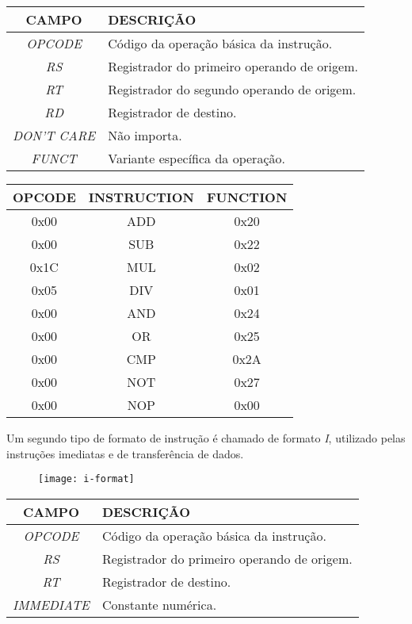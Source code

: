 \begin{table}[H]
\centering	
\begin{tabular}{|c|l|}
	\hline 
	\cellcolor[gray]{0.9}\textbf{CAMPO} & \cellcolor[gray]{0.9}\textbf{DESCRIÇÃO} \\ 
	\hline 
	\textit{OPCODE} & Código da operação básica da instrução. \\ 
	\hline 
	\textit{RS} & Registrador do primeiro operando de origem. \\ 
	\hline 
	\textit{RT} & Registrador do segundo operando de origem. \\ 
	\hline 
	\textit{RD} & Registrador de destino. \\ 
	\hline 
	\textit{DON'T CARE} & Não importa. \\ 
	\hline 
	\textit{FUNCT} & Variante específica da operação. \\ 
	\hline 
	\end{tabular} 
	\end{table}	

\begin{table}[H]
\centering
	\begin{tabular}{|c|c|c|}
  	\hline 
  	\cellcolor[gray]{0.9}\textbf{OPCODE} & \cellcolor[gray]{0.9}\textbf{INSTRUCTION} & \cellcolor[gray]{0.9}\textbf{FUNCTION} \\ 
  	\hline 
  	0x00 & ADD & 0x20 \\ 
  	\hline 
  	0x00 & SUB & 0x22 \\ 
  	\hline 
  	0x1C & MUL & 0x02 \\ 
  	\hline 
  	0x05 & DIV & 0x01 \\ 
  	\hline 
  	0x00 & AND & 0x24 \\ 
  	\hline 
  	0x00 & OR & 0x25 \\ 
  	\hline 
  	0x00 & CMP & 0x2A \\ 
  	\hline 
  	0x00 & NOT & 0x27 \\ 
  	\hline
  	0x00 & NOP & 0x00 \\
  	\hline 
  	\end{tabular} 
  \end{table} 
  	 	
  	
	 Um segundo tipo de formato de instrução é chamado de formato \textit{I}, utilizado pelas instruções imediatas e de transferência de dados.
	\begin{figure}[H]
    	\centering
    	\texttt{[image: i-format]}
  	\end{figure}
  	
  	\begin{table}[H]
\centering	
\begin{tabular}{|c|l|}
	\hline 
	\cellcolor[gray]{0.9}\textbf{CAMPO} & \cellcolor[gray]{0.9}\textbf{DESCRIÇÃO} \\ 
	\hline 
	\textit{OPCODE} & Código da operação básica da instrução. \\ 
	\hline 
	\textit{RS} & Registrador do primeiro operando de origem. \\ 
	\hline 
	\textit{RT} & Registrador de destino. \\ 
	\hline 
	\textit{IMMEDIATE} & Constante numérica. \\ 
	\hline 
	\end{tabular} 
	\end{table}
	
